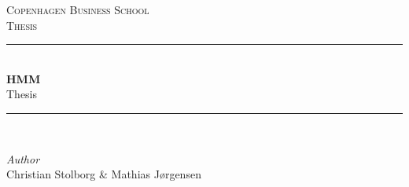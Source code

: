 

\begin{titlepage}

\newcommand{\HRule}{\rule{\linewidth}{0.5mm}} %



    


\begin{center}
    


\textsc{\Large Copenhagen Business School}\\[0.5cm] 
\textsc{\large Thesis}\\[0.5cm] 


\HRule \\[0.4cm]
{ \huge \bfseries HMM}\\
{\Large Thesis} 
\HRule \\[1.5cm]


\end{center}


\begin{center}
    \large
    \textit{Author}\\
    Christian Stolborg \& Mathias Jørgensen
\end{center}

\vspace{2cm}






\end{titlepage}
